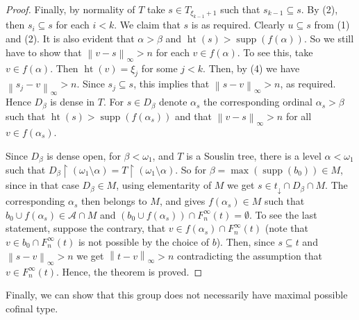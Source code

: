 \documentclass{amsart}
\theoremstyle{plain}
\theoremstyle{definition}
\numberwithin{equation}{section}
\renewcommand{\a}{\alpha}
\renewcommand{\b}{\beta}
\renewcommand{\o}{\omega}
\newcommand{\ps}{\emptyset}
\newcommand{\rest}{\upharpoonright}
\newcommand{\sst}{\subseteq}
\newcommand{\norm}[1]{\left\lVert#1\right\rVert_{\infty}}
\newcommand{\supp}{\operatorname{supp}}
\newcommand{\h}{\operatorname{ht}}
\begin{document}
\begin{proof}
	Finally, by normality of $T$ take $s\in T_{\xi_{k-1}+1}$ such that $s_{k-1}\sst s$.
	By (2), then $s_i\sst s$ for each $i<k$.
	We claim that $s$ is as required.
	Clearly $u\sst s$ from (1) and (2).
	It is also evident that $\a>\b$ and $\h(s)>\supp(f(\a))$. 
	So we still have to show that $\norm{v-s}>n$ for each $v\in f(\a)$.
	To see this, take $v\in f(\a)$.
	Then $\h(v)=\xi_j$ for some $j<k$.
	Then, by (4) we have $\norm{s_j-v}>n$.
	Since $s_j\sst s$, this implies that $\norm{s-v}>n$, as required.
	Hence $D_{\b}$ is dense in $T$.
	For $s\in D_{\b}$ denote $\a_s$ the corresponding ordinal $\a_s>\b$ such that $\h(s)>\supp(f(\a_s))$ and that $\norm{v-s}>n$ for all $v\in f(\a_s)$.

	Since $D_{\b}$ is dense open, for $\b<\o_1$, and $T$ is a Souslin tree, there is a level $\a<\o_1$ such that $D_{\b}\rest (\o_1\setminus\a)=T\rest (\o_1\setminus\a)$.
	So for $\b=\max(\supp(b_0))\in M$, since in that case $D_{\b}\in M$, using elementarity of $M$ we get $s\in t_{\downarrow}\cap D_{\b}\cap M$.
	The corresponding $\a_s$ then belongs to $M$, and gives $f(\a_s)\in M$ such that $b_0\cup f(\a_s)\in \mathcal A\cap M$ and $(b_0\cup f(\a_s))\cap F^{\infty}_n(t)=\ps$.
	To see the last statement, suppose the contrary, that $v\in f(\a_s)\cap F^{\infty}_n(t)$ (note that $v\in b_0\cap F^{\infty}_n(t)$ is not possible by the choice of $b$).
	Then, since $s\sst t$ and $\norm{s-v}>n$ we get $\norm{t-v}>n$ contradicting the assumption that $v\in F^{\infty}_n(t)$.
	Hence, the theorem is proved.
\end{proof}

Finally, we can show that this group does not necessarily have maximal possible cofinal type.
\end{document}
